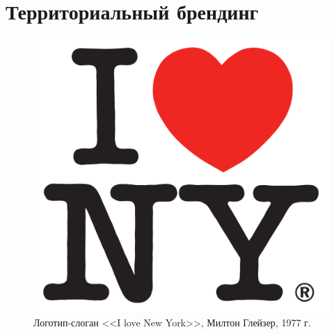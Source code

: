 \section{Территориальный брендинг}
\label{app:territorial}

\begin{figure}[ht]
  \centering
  \includegraphics[width=.5\linewidth]{images/supplement/territorial/ny}
  \caption{Логотип-слоган <<I love New York>>, Милтон Глейзер, 1977 г.}
  \label{fig:territorial:ny}
\end{figure}
